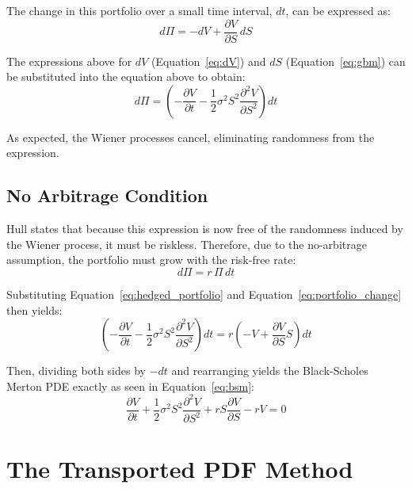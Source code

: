 \documentclass[12pt, onecolumn, journal]{IEEEtran}
\begin{document}
The change in this portfolio over a small time interval, $dt$, can be expressed as:
\begin{equation}
    d \Pi = - dV + \frac{\partial V}{\partial S}\, dS
\end{equation}

The expressions above for $dV$ (Equation~\ref{eq:dV}) and $dS$ (Equation~\ref{eq:gbm}) can be substituted into the equation above to obtain:
\begin{equation}
    d\Pi = \left(- \frac{\partial V}{\partial t} - \frac{1}{2}\sigma^2 S^2 \frac{\partial^2 V}{\partial S^2}\right)dt
    \label{eq:portfolio_change}
\end{equation}

As expected, the Wiener processes cancel, eliminating randomness from the expression.

\subsection{No Arbitrage Condition}
Hull states that because this expression is now free of the randomness induced by the Wiener process, it must be riskless. Therefore, due to the no-arbitrage assumption, the portfolio must grow with the risk-free rate:
\begin{equation}
    d \Pi = r\, \Pi\, d t
\end{equation}

Substituting Equation~\ref{eq:hedged_portfolio} and Equation~\ref{eq:portfolio_change} then yields:
\begin{equation}
    \left(- \frac{\partial V}{\partial t} - \frac{1}{2}\sigma^2 S^2 \frac{\partial^2 V}{\partial S^2}\right)dt = r\left(-V + \frac{\partial V}{\partial S}S\right)dt
\end{equation}

Then, dividing both sides by $-dt$ and rearranging yields the Black-Scholes Merton PDE exactly as seen in Equation~\ref{eq:bsm}:
\begin{equation}
    \frac{\partial V}{\partial t} + \frac{1}{2}\sigma^2 S^2 \frac{\partial^2 V}{\partial S^2} + rS\frac{\partial V}{\partial S} - rV = 0
\end{equation}

\section{The Transported PDF Method}
\end{document}
